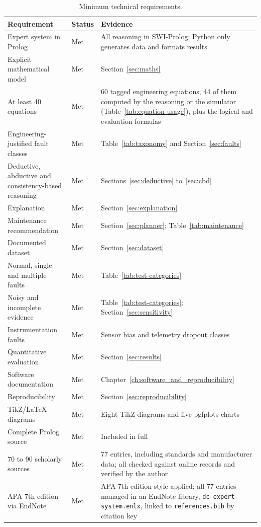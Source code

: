 \begin{table}[htbp]
  \centering
  \small
  \caption{Minimum technical requirements.}
  \label{tab:requirements}
  \begin{tabular}{L{4.0cm}L{2.5cm}L{7.5cm}}
    \toprule
    Requirement & Status & Evidence \\
    \midrule
    Expert system in Prolog & Met & All reasoning in SWI-Prolog; Python only generates data and formats results \\
    Explicit mathematical model & Met & Section~\ref{sec:maths} \\
    At least 40 equations & Met & 60 tagged engineering equations, 44 of them computed by the reasoning or the simulator (Table~\ref{tab:equation-usage}), plus the logical and evaluation formulas \\
    Engineering-justified fault classes & Met & Table~\ref{tab:taxonomy} and Section~\ref{sec:faults} \\
    Deductive, abductive and consistency-based reasoning & Met & Sections~\ref{sec:deductive} to~\ref{sec:cbd} \\
    Explanation & Met & Section~\ref{sec:explanation} \\
    Maintenance recommendation & Met & Section~\ref{sec:planner}; Table~\ref{tab:maintenance} \\
    Documented dataset & Met & Section~\ref{sec:dataset} \\
    Normal, single and multiple faults & Met & Table~\ref{tab:test-categories} \\
    Noisy and incomplete evidence & Met & Table~\ref{tab:test-categories}; Section~\ref{sec:sensitivity} \\
    Instrumentation faults & Met & Sensor bias and telemetry dropout classes \\
    Quantitative evaluation & Met & Section~\ref{sec:results} \\
    Software documentation & Met & Chapter~\ref{ch:software_and_reproducibility} \\
    Reproducibility & Met & Section~\ref{sec:reproducibility} \\
    TikZ/LaTeX diagrams & Met & Eight TikZ diagrams and five pgfplots charts \\
    Complete Prolog source & Met & Included in full \\
    70 to 90 scholarly sources & Met & 77 entries, including standards and manufacturer data; all checked against online records and verified by the author \\
    APA 7th edition via EndNote & Met & APA 7th edition style applied; all 77 entries managed in an EndNote library, \texttt{dc-expert-system.enlx}, linked to \texttt{references.bib} by citation key \\
    \bottomrule
  \end{tabular}
\end{table}

